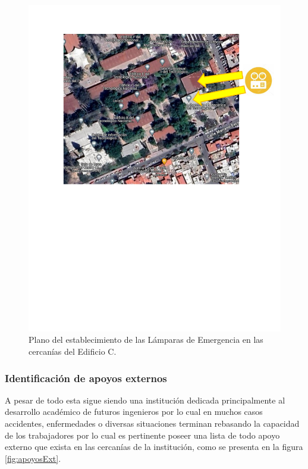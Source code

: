\begin{figure}[H]
    \centering
    \includegraphics[trim = {0mm 140mm 0mm 12mm},clip,scale=0.3]{19/Img/planoLocalizadorLampara.pdf}
    \caption{Plano del establecimiento de las Lámparas de Emergencia en las cercanías del Edificio C.}
    \label{fig:planoLocalizadorLampara}
\end{figure}
\subsubsection{ Identificación de apoyos externos}
A pesar de todo esta sigue siendo una institución dedicada principalmente al desarrollo académico de futuros ingenieros por lo cual en muchos casos accidentes, enfermedades o diversas situaciones terminan rebasando la capacidad de los trabajadores por lo cual es pertinente poseer una lista de todo apoyo externo que exista en las cercanías de la institución, como se presenta en la figura \ref{fig:apoyosExt}.

